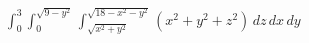 \item $\int_0^3 \int_0^{\sqrt{9-y^2}} \int_{\sqrt{x^2+y^2}}^{\sqrt{18-x^2-y^2}} (x^2 + y^2 + z^2) \, dz \, dx \, dy$
